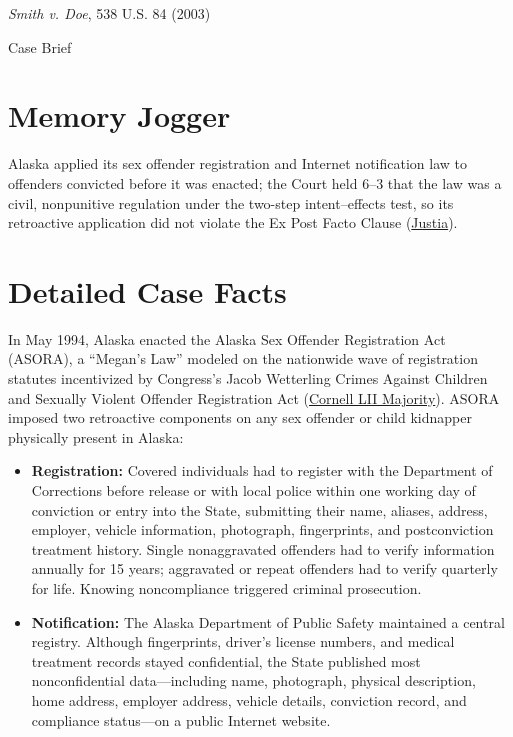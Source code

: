 \documentclass[12pt]{article}
\begin{document}
\begin{center}
{\LARGE \textit{Smith v. Doe}, 538 U.S. 84 (2003)\par}
\vspace{0.8em}
{\large Case Brief\par}
\end{center}
\vspace{1em}

\section{Memory Jogger}
Alaska applied its sex offender registration and Internet notification law to offenders convicted before it was enacted; the Court held 6--3 that the law was a civil, nonpunitive regulation under the two-step intent--effects test, so its retroactive application did not violate the Ex Post Facto Clause (\href{https://supreme.justia.com/cases/federal/us/538/84/}{Justia}).

\section{Detailed Case Facts}
In May 1994, Alaska enacted the Alaska Sex Offender Registration Act (ASORA), a ``Megan's Law'' modeled on the nationwide wave of registration statutes incentivized by Congress's Jacob Wetterling Crimes Against Children and Sexually Violent Offender Registration Act (\href{https://www.law.cornell.edu/supct/html/01-729.ZO.html}{Cornell LII Majority}). ASORA imposed two retroactive components on any sex offender or child kidnapper physically present in Alaska:
\begin{itemize}
  \item \textbf{Registration:} Covered individuals had to register with the Department of Corrections before release or with local police within one working day of conviction or entry into the State, submitting their name, aliases, address, employer, vehicle information, photograph, fingerprints, and postconviction treatment history. Single nonaggravated offenders had to verify information annually for 15 years; aggravated or repeat offenders had to verify quarterly for life. Knowing noncompliance triggered criminal prosecution.
  \item \textbf{Notification:} The Alaska Department of Public Safety maintained a central registry. Although fingerprints, driver's license numbers, and medical treatment records stayed confidential, the State published most nonconfidential data---including name, photograph, physical description, home address, employer address, vehicle details, conviction record, and compliance status---on a public Internet website.
\end{itemize}
\end{document}
